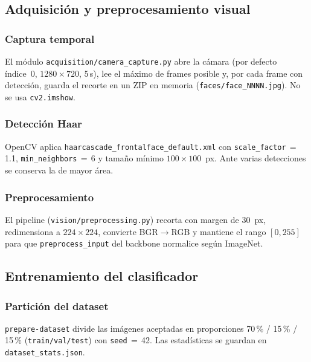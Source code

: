 \subsection{Adquisición y preprocesamiento visual}
\label{subsec:adquisicion}

\subsubsection{Captura temporal}

El módulo \texttt{acquisition/camera\_capture.py} abre la cámara (por defecto
índice~0, $1280 \times 720$, 5\,s), lee el máximo de frames posible y, por cada
frame con detección, guarda el recorte en un ZIP en memoria
(\texttt{faces/face\_NNNN.jpg}). No se usa \texttt{cv2.imshow}.

\subsubsection{Detección Haar}

OpenCV aplica \texttt{haarcascade\_frontalface\_default.xml} con
\texttt{scale\_factor}\,$=$\,1.1, \texttt{min\_neighbors}\,$=$\,6 y tamaño mínimo
$100 \times 100$~px. Ante varias detecciones se conserva la de mayor área.

\subsubsection{Preprocesamiento}

El pipeline (\texttt{vision/preprocessing.py}) recorta con margen de 30~px,
redimensiona a $224 \times 224$, convierte BGR$\rightarrow$RGB y mantiene el rango
$[0, 255]$ para que \texttt{preprocess\_input} del backbone normalice según ImageNet.

\subsection{Entrenamiento del clasificador}
\label{subsec:entrenamiento}

\subsubsection{Partición del dataset}

\texttt{prepare-dataset} divide las imágenes aceptadas en proporciones
70\,\% / 15\,\% / 15\,\% (\texttt{train/val/test}) con \texttt{seed}\,$=$\,42.
Las estadísticas se guardan en \texttt{dataset\_stats.json}.

